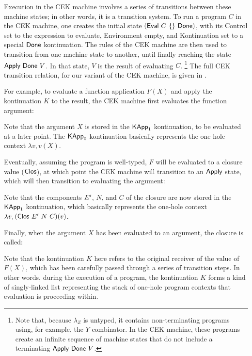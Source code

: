 Execution in the CEK machine involves a series of transitions between
these machine states; in other words, it is a transition system. To
run a program $C$ in the CEK machine, one creates the initial state
$(\Eval~C~\{\}~\Done)$, with its Control set to the expression to
evaluate, Environment empty, and Kontinuation set to a special $\Done$
kontinuation. The rules of the CEK machine are then used to transition
from one machine state to another, until finally reaching the state
$\Apply~\Done~V$. In that state, $V$ is the result of evaluating
$C$.%
\footnote{Note that, because $\lambda_Z$ is untyped, it contains
non-terminating programs using, for example, the $Y$ combinator. In
the CEK machine, these programs create an infinite sequence of machine
states that do not include a terminating $\Apply~\Done~V$.}
The full CEK transition relation,
  for our variant of the CEK machine,
  is given in .

For example, to evaluate a function application $F(X)$
  and apply the kontinuation $K$ to the result,
  the CEK machine first evaluates the function argument:
\begin{mathpar}
\end{mathpar}
Note that the argument $X$ is stored in the $\KApp_1$ kontinuation,
to be evaluated at a later point. The $\KApp_0$ kontinuation basically
represents the one-hole context $\lambda v, v(X)$.

Eventually, assuming the program is well-typed, $F$ will be evaluated
to a closure value ($\Clos$), at which point the CEK machine will
transition to an $\Apply$ state, which will then transition to
evaluating the argument:
\begin{mathpar}
\end{mathpar}
Note that the components $\Env'$, $N$, and $C$ of the closure are now
stored in the $\KApp_1$ kontinuation, which basically represents
the one-hole context $\lambda v, (\Clos~\Env'~N~C)(v)$.

Finally, when the argument $X$ has been evaluated to an argument,
  the closure is called:
\begin{mathpar}
\end{mathpar}
Note that the kontinuation $K$ here refers to the original receiver
  of the value of $F(X)$, which has been carefully passed
  through a series of transition steps.
In other words, during the execution of a program,
  the kontinuation $K$ forms a kind of singly-linked list
  representing the stack of one-hole program contexts
  that evaluation is proceeding within.

